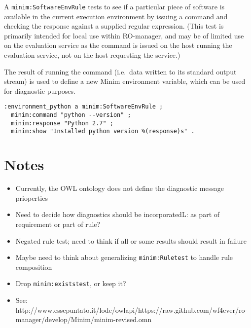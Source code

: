 \documentclass[]{article}
\begin{document}
A \texttt{minim:SoftwareEnvRule} tests to see if a particular piece of
software is available in the current execution environment by issuing a
command and checking the response against a supplied regular expression.
(This test is primarily intended for local use within RO-manager, and
may be of limited use on the evaluation service as the command is issued
on the host running the evaluation service, not on the host requesting
the service.)

The result of running the command (i.e.~data written to its standard
output stream) is used to define a new Minim environment variable, which
can be used for diagnostic purposes.

\begin{verbatim}
:environment_python a minim:SoftwareEnvRule ;
  minim:command "python --version" ;
  minim:response "Python 2.7" ;
  minim:show "Installed python version %(response)s" .
\end{verbatim}

\section{Notes}

\begin{itemize}
\itemsep1pt\parskip0pt
\item
  Currently, the OWL ontology does not define the diagnostic message
  prioperties
\item
  Need to decide how diagnostics should be incorporatedL: as part of
  requirement or part of rule?
\item
  Negated rule test; need to think if all or some results should result
  in failure
\item
  Maybe need to think about generalizing \texttt{minim:Ruletest} to
  handle rule composition
\item
  Drop \texttt{minim:existstest}, or keep it?
\item
  See:
  http://www.essepuntato.it/lode/owlapi/https://raw.github.com/wf4ever/ro-manager/develop/Minim/minim-revised.omn
\end{itemize}
\end{document}
